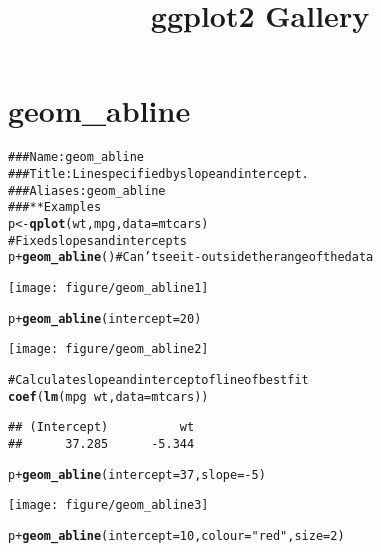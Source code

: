 \documentclass[a4paper,titlepage]{tufte-handout}\usepackage{graphicx, color}
\title{ggplot2 Gallery}
\makeatletter
\def\maxwidth{ %
  \ifdim\Gin@nat@width>\linewidth
    \linewidth
  \else
    \Gin@nat@width
  \fi
}
\newcommand{\hlfunctioncall}[1]{\textcolor[rgb]{0.501960784313725,0,0.329411764705882}{\textbf{#1}}}%
\newcommand{\hlstring}[1]{\textcolor[rgb]{0.6,0.6,1}{#1}}%
\newcommand{\hlcomment}[1]{\textcolor[rgb]{0.180392156862745,0.6,0.341176470588235}{#1}}%
\newenvironment{kframe}{%
 \def\at@end@of@kframe{}%
 \ifinner\ifhmode%
  \def\at@end@of@kframe{\end{minipage}}%
  \begin{minipage}{\columnwidth}%
 \fi\fi%
 \def\FrameCommand##1{\hskip\@totalleftmargin \hskip-\fboxsep
 \colorbox{shadecolor}{##1}\hskip-\fboxsep
     \hskip-\linewidth \hskip-\@totalleftmargin \hskip\columnwidth}%
 \MakeFramed {\advance\hsize-\width
   \@totalleftmargin\z@ \linewidth\hsize
   \@setminipage}}%
 {\par\unskip\endMakeFramed%
 \at@end@of@kframe}
\newenvironment{knitrout}{}{} %
\makeatother
\begin{document}
\maketitle
\tableofcontents







\section{geom\_abline}

\begin{knitrout}
\color{fgcolor}\begin{kframe}
\begin{alltt}
\hlcomment{### Name: geom_abline}
\hlcomment{### Title: Line specified by slope and intercept.}
\hlcomment{### Aliases: geom_abline}
\hlcomment{### ** Examples}
p <- \hlfunctioncall{qplot}(wt, mpg, data = mtcars)
\hlcomment{# Fixed slopes and intercepts}
p + \hlfunctioncall{geom_abline}() \hlcomment{# Can't see it - outside the range of the data}
\end{alltt}
\end{kframe}\texttt{[image: figure/geom\_abline1]} \begin{kframe}\begin{alltt}
p + \hlfunctioncall{geom_abline}(intercept = 20)
\end{alltt}
\end{kframe}\texttt{[image: figure/geom\_abline2]} \begin{kframe}\begin{alltt}
\hlcomment{# Calculate slope and intercept of line of best fit}
\hlfunctioncall{coef}(\hlfunctioncall{lm}(mpg ~ wt, data = mtcars))
\end{alltt}
\begin{verbatim}
## (Intercept)          wt 
##      37.285      -5.344 
\end{verbatim}
\begin{alltt}
p + \hlfunctioncall{geom_abline}(intercept = 37, slope = -5)
\end{alltt}
\end{kframe}\texttt{[image: figure/geom\_abline3]} \begin{kframe}\begin{alltt}
p + \hlfunctioncall{geom_abline}(intercept = 10, colour = \hlstring{"red"}, size = 2)
\end{alltt}

\end{kframe}
\end{knitrout}
\end{document}
